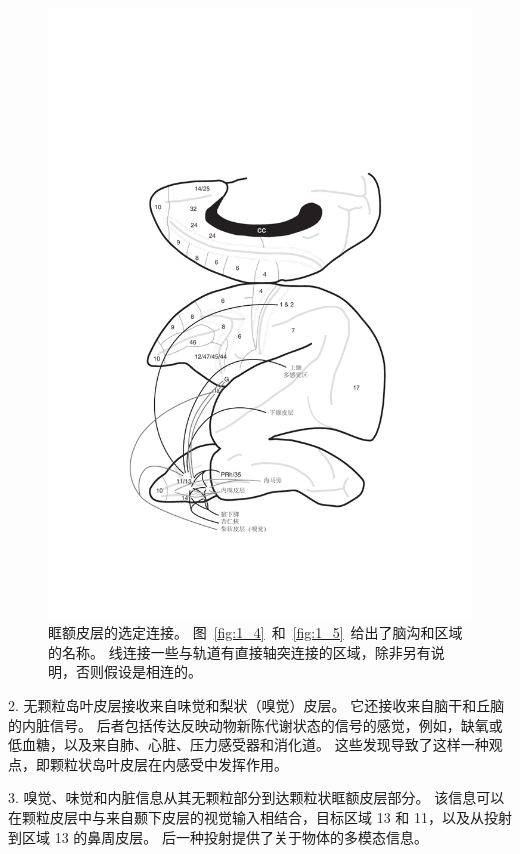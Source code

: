 \begin{figure}[!htb]
	\centering
	\includegraphics{chap4/fig_4_2}
	\caption{眶额皮层的选定连接。
		图~\ref{fig:1_4}~和~\ref{fig:1_5}~给出了脑沟和区域的名称。
		线连接一些与轨道有直接轴突连接的区域，除非另有说明，否则假设是相连的。}\label{fig:fig_4_2}
\end{figure}


2. 无颗粒岛叶皮层接收来自味觉和梨状（嗅觉）皮层\cite{carmichael1995sensory}。
它还接收来自脑干和丘脑的内脏信号\cite{ray1992organization}。
后者包括传达反映动物新陈代谢状态的信号的感觉，例如，缺氧或低血糖，以及来自肺、心脏、压力感受器和消化道\cite{craig2002you}。
这些发现导致了这样一种观点，即颗粒状岛叶皮层在内感受中发挥作用。\par


3. 嗅觉、味觉和内脏信息从其无颗粒部分到达颗粒状眶额皮层部分\cite{carmichael1994architectonic}。
该信息可以在颗粒皮层中与来自颞下皮层的视觉输入相结合，目标区域 13 和 11，以及从投射到区域 13 的鼻周皮层\cite{saleem2008complementary}。
后一种投射提供了关于物体的多模态信息\cite{murray2007orbitofrontal}。\par


